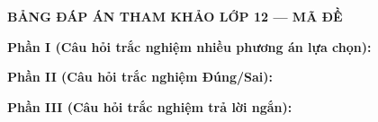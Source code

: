
\newpage
\begin{center} \textbf{BẢNG ĐÁP ÁN THAM KHẢO LỚP 12 --- MÃ ĐỀ \thedeso} \end{center}

\noindent \textbf{Phần I (Câu hỏi trắc nghiệm nhiều phương án lựa chọn):}  

\noindent \textbf{Phần II (Câu hỏi trắc nghiệm Đúng/Sai):}

\noindent \textbf{Phần III (Câu hỏi trắc nghiệm trả lời ngắn):}

\label{B\thedeso}

